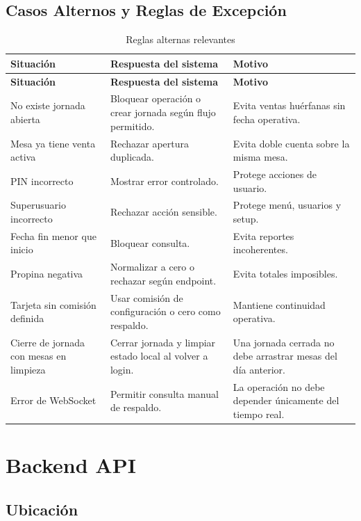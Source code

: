 \documentclass[11pt,letterpaper,openany]{report}
\begin{document}
\section{Casos Alternos y Reglas de Excepción}

\begin{longtable}{p{}p{}p{}}
\caption{Reglas alternas relevantes}\\
\toprule
\textbf{Situación} & \textbf{Respuesta del sistema} & \textbf{Motivo}\\
\midrule
\endfirsthead
\toprule
\textbf{Situación} & \textbf{Respuesta del sistema} & \textbf{Motivo}\\
\midrule
\endhead
No existe jornada abierta & Bloquear operación o crear jornada según flujo permitido. & Evita ventas huérfanas sin fecha operativa.\\
Mesa ya tiene venta activa & Rechazar apertura duplicada. & Evita doble cuenta sobre la misma mesa.\\
PIN incorrecto & Mostrar error controlado. & Protege acciones de usuario.\\
Superusuario incorrecto & Rechazar acción sensible. & Protege menú, usuarios y setup.\\
Fecha fin menor que inicio & Bloquear consulta. & Evita reportes incoherentes.\\
Propina negativa & Normalizar a cero o rechazar según endpoint. & Evita totales imposibles.\\
Tarjeta sin comisión definida & Usar comisión de configuración o cero como respaldo. & Mantiene continuidad operativa.\\
Cierre de jornada con mesas en limpieza & Cerrar jornada y limpiar estado local al volver a login. & Una jornada cerrada no debe arrastrar mesas del día anterior.\\
Error de WebSocket & Permitir consulta manual de respaldo. & La operación no debe depender únicamente del tiempo real.\\
\bottomrule
\end{longtable}

\chapter{Backend API}

\section{Ubicación}
\end{document}
